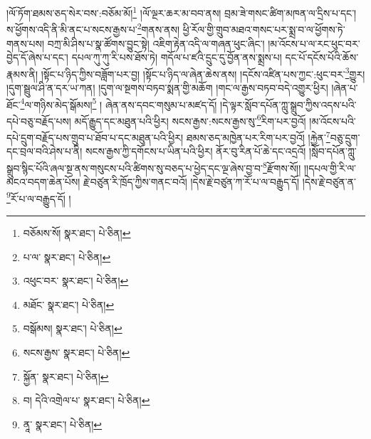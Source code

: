 །ལོ་ཏོག་ཐམས་ཅད་སེར་བས་:བཅོམ་མོ།\footnote{བཅོམས་སོ།  སྣར་ཐང་།  པེ་ཅིན། } །ལོ་ལྔར་ཆར་མ་བབ་ནས། བྲམ་ཟེ་གསང་ཚིག་མཁན་ལ་དྲིས་པ་དང་། ས་ཕྱོགས་འདི་ནི་མི་ནང་པ་སངས་རྒྱས་པ་\footnote{པ་ལ་  སྣར་ཐང་།  པེ་ཅིན། }གནས་ནས། ཕྱི་རོལ་གྱི་གྲུབ་མཐའ་གསང་པར་སྨྲ་བ་ལ་ཕྱོགས་ཏེ་གནས་པས། བཀྲ་མི་ཤིས་པ་སྣ་ཚོགས་བྱུང་སྟེ། འཇིག་རྟེན་འདི་ལ་གཞན་ཕུང་ཞིང་། །མ་འོངས་པ་ལ་རང་ཕུང་བར་བྱེད་དོ་ཞེས་པ་དང་། དཔལ་ཀུ་ཀུ་རི་པས་ཐོས་ཏེ། གདོལ་པ་ཛའི་དྲུང་དུ་བྱོན་ནས་སྨྲས་པ། དང་པོ་དངོས་པོའི་ཆོས་རྣམས་ནི། །སྟོང་པ་ཉིད་ཀྱིས་བཟློག་པར་བྱ། །སྟོང་པ་ཉིད་ལ་ཞེན་ཆེས་ནས། །དངོས་འཛིན་པས་ཀྱང་:ཕུང་བར་\footnote{འཕུང་བར་  སྣར་ཐང་།  པེ་ཅིན། }གྱུར། །དུག་སྦྲུལ་ཤི་ན་དར་ཡ་ཀན། །དུག་ལ་སྔགས་བཏབ་སྨན་གྱི་མཆོག །གང་ལ་རྒྱས་བཏབ་བདེ་འགྱུར་ཕྱིར། །ཞེན་པ་ཐོང་\footnote{མཐོང་  སྣར་ཐང་།  པེ་ཅིན། }ལ་གཉིས་མེད་སྒོམས།\footnote{བསྒོམས།  སྣར་ཐང་།  པེ་ཅིན། } །
ཞེན་ནས་དབང་གསུམ་པ་མཛད་དོ། །དེ་ལྟར་སློབ་དཔོན་ཀླུ་སྒྲུབ་ཀྱིས་འདས་པའི་དཔེ་བཅུ་བརྗོད་པས། མདོ་རྒྱུད་དང་མཐུན་པའི་ཕྱིར། སངས་རྒྱས་:སངས་རྒྱས་སུ་\footnote{སངས་རྒྱས་  སྣར་ཐང་།  པེ་ཅིན། }རིག་པར་བྱའོ། །མ་འོངས་པའི་དཔེ་དྲུག་བརྗོད་པས་གྲུབ་པ་ཐོབ་པ་དང་མཐུན་པའི་ཕྱིར། ཐམས་ཅད་མཁྱེན་པར་རིག་པར་བྱའོ། །རྐྱེན་\footnote{སྐྱོན་  སྣར་ཐང་།  པེ་ཅིན། }བཅུ་དྲུག་དང་བྲལ་བའི་ཤེས་པ་ནི། སངས་རྒྱས་ཀྱི་དགོངས་པ་ཡིན་པའི་ཕྱིར། ནོར་བུ་རིན་པོ་ཆེ་དང་འདྲའོ། །སློབ་དཔོན་ཀླུ་སྒྲུབ་སྙིང་པོའི་ཞལ་སྔ་ནས་གསུངས་པའི་ཚིགས་སུ་བཅད་པ་ཕྱེད་དང་ལྔ་ཞེས་བྱ་བ་\footnote{བ། དེའི་འགྲེལ་པ་  སྣར་ཐང་།  པེ་ཅིན། }རྫོགས་སོ།། །།དཔལ་གྱི་རི་ལ་མངའ་བདག་ཆེན་པོས། རྗེ་བཙུན་རི་ཁྲོད་ཀྱིས་གནང་བའོ། །དེས་རྗེ་བཙུན་ཀ་རོ་པ་ལ་བརྒྱུད་དོ། །དེས་རྗེ་བཙུན་ན་\footnote{ནཱ་  སྣར་ཐང་།  པེ་ཅིན། }རོ་པ་ལ་བརྒྱུད་དོ། ། 